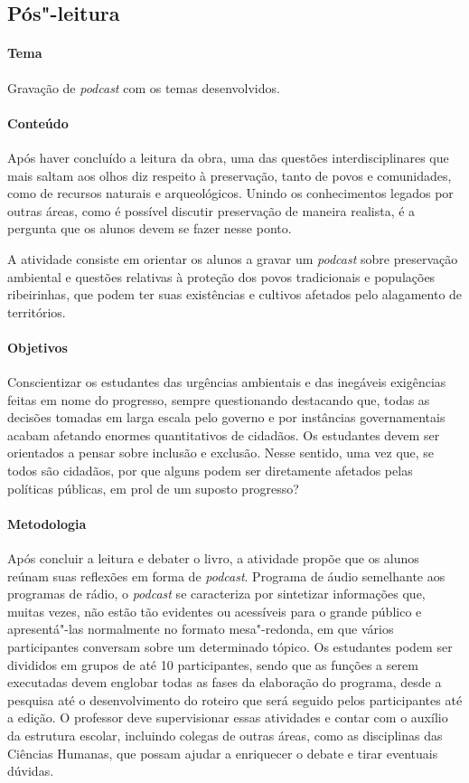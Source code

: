 \documentclass[12pt]{extarticle}
\begin{document}
\subsection{Pós"-leitura}

\paragraph{Tema} Gravação de \emph{podcast} com os temas desenvolvidos.  

\paragraph{Conteúdo}
Após haver concluído a leitura da obra, uma das questões
interdisciplinares que mais saltam aos olhos diz respeito à
preservação, tanto de povos e comunidades, como de recursos naturais e
arqueológicos. Unindo os conhecimentos legados por outras áreas, como
é possível discutir preservação de maneira realista, é a pergunta que
os alunos devem se fazer nesse ponto.

  A atividade consiste em orientar os alunos a gravar um \emph{podcast}
  sobre preservação ambiental e questões relativas à proteção dos povos
  tradicionais e populações ribeirinhas, que podem ter suas existências
  e cultivos afetados pelo alagamento de territórios.

\paragraph{Objetivos}
  Conscientizar os estudantes das urgências ambientais e das inegáveis
  exigências feitas em nome do progresso, sempre questionando destacando
  que, todas as decisões tomadas em larga escala pelo governo e por
  instâncias governamentais acabam afetando enormes quantitativos de
  cidadãos. Os estudantes devem ser orientados a pensar sobre inclusão e
  exclusão. Nesse sentido, uma vez que, se todos são cidadãos, por que
  alguns podem ser diretamente afetados pelas políticas públicas, em
  prol de um suposto progresso?

\paragraph{Metodologia}
  Após concluir a leitura e debater o livro, a atividade propõe que os
  alunos reúnam suas reflexões em forma de \emph{podcast}. Programa de
  áudio semelhante aos programas de rádio, o \emph{podcast} se
  caracteriza por sintetizar informações que, muitas vezes, não estão
  tão evidentes ou acessíveis para o grande público e apresentá"-las
  normalmente no formato mesa"-redonda, em que vários participantes
  conversam sobre um determinado tópico. Os estudantes podem ser
  divididos em grupos de até 10 participantes, sendo que as funções a
  serem executadas devem englobar todas as fases da elaboração do
  programa, desde a pesquisa até o desenvolvimento do roteiro que será
  seguido pelos participantes até a edição. O professor deve
  supervisionar essas atividades e contar com o auxílio da estrutura
  escolar, incluindo colegas de outras áreas, como as disciplinas das Ciências Humanas, que possam ajudar a
  enriquecer o debate e tirar eventuais dúvidas.
\end{document}
